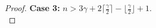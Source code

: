 \documentclass[12pt]{amsart}
\newcommand{\floor}[1]{\lfloor{#1}\rfloor}
\newcommand{\ceil}[1]{\lceil{#1}\rceil}
\begin{document}
\begin{proof}
\textbf{Case 3:} $n >  3\gamma + 2 \lceil \frac{\gamma}{2} \rceil - \lfloor \frac{\gamma}{2}\rfloor+ 1.$\\

\end{proof}
\end{document}
